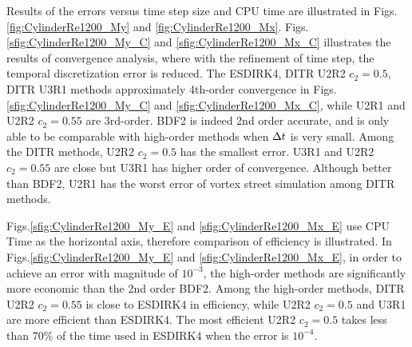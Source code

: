 Results of the errors versus time step size and CPU time
are illustrated in
Figs.\ref{fig:CylinderRe1200_My} and \ref{fig:CylinderRe1200_Mx}.
Figs.\ref{sfig:CylinderRe1200_My_C} and \ref{sfig:CylinderRe1200_Mx_C}
illustrates the results of convergence analysis, where
with the refinement of time step, the temporal
discretization error is reduced.
The ESDIRK4, DITR U2R2 $c_2=0.5$, DITR U3R1 methods
approximately 4th-order convergence in
Figs.\ref{sfig:CylinderRe1200_My_C} and \ref{sfig:CylinderRe1200_Mx_C},
while U2R1 and U2R2 $c_2=0.55$ are 3rd-order.
BDF2 is indeed 2nd order accurate, and is only able
to be comparable with high-order methods when ${\Delta} t$
is very small.
Among the DITR methods, U2R2 $c_2=0.5$ has the smallest error.
U3R1 and U2R2 $c_2=0.55$ are close but U3R1 has higher order of convergence.
Although better than BDF2,
U2R1 has the worst error of vortex street simulation among DITR methods.

Figs.\ref{sfig:CylinderRe1200_My_E} and \ref{sfig:CylinderRe1200_Mx_E}
use CPU Time as the horizontal axis, therefore comparison of efficiency is illustrated.
In Figs.\ref{sfig:CylinderRe1200_My_E} and \ref{sfig:CylinderRe1200_Mx_E},
in order to achieve an error with magnitude of $10^{-3}$, the
high-order methods are significantly more economic than the
2nd order BDF2.
Among the high-order methods, DITR U2R2 $c_2=0.55$ is
close to ESDIRK4 in efficiency, while
U2R2 $c_2=0.5$ and U3R1 are more efficient than ESDIRK4.
The most efficient U2R2 $c_2=0.5$ takes less than 70\% of
the time used in ESDIRK4 when the error is $10^{-4}$.




